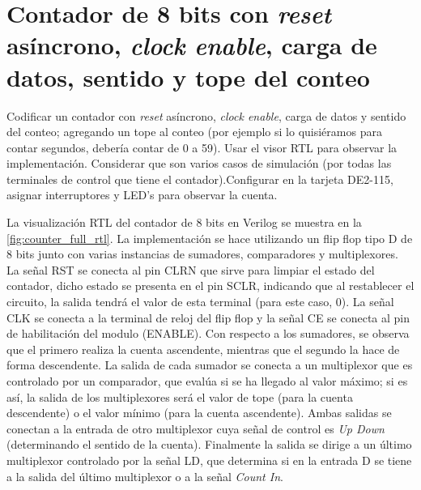 \section{Contador de 8 bits con \textit{reset} asíncrono, \textit{clock enable}, carga de datos, sentido y tope del conteo \label{sec:s4}}

\begin{center}
	\begin{minipage}{12cm}
		\begin{tcolorbox}[title=Actividad 4]
			Codificar un contador con \textit{reset} asíncrono, \textit{clock enable}, carga de datos y sentido del conteo; agregando un tope al conteo (por ejemplo si lo quisiéramos para contar segundos, debería contar de 0 a 59). Usar el visor RTL para observar la implementación. Considerar que son varios casos de simulación (por todas las terminales de control que tiene el contador).Configurar en la tarjeta DE2-115, asignar interruptores y LED's para observar la cuenta.
		\end{tcolorbox}	
	\end{minipage}
\end{center}

La visualización RTL del contador de 8 bits en Verilog se muestra en la \autoref{fig:counter_full_rtl}. La implementación se hace utilizando un flip flop tipo D de 8 bits junto con varias instancias de sumadores, comparadores y multiplexores. La señal RST se conecta al pin CLRN que sirve para limpiar el estado del contador, dicho estado se presenta en el pin SCLR, indicando que al restablecer el circuito, la salida tendrá el valor de esta terminal (para este caso, 0). La señal CLK se conecta a la terminal de reloj del flip flop y la señal CE se conecta al pin de habilitación del modulo (ENABLE). Con respecto a los sumadores, se observa que el primero realiza la cuenta ascendente, mientras que el segundo la hace de forma descendente. La salida de cada sumador se conecta a un multiplexor que es controlado por un comparador, que evalúa si se ha llegado al valor máximo; si es así, la salida de los multiplexores será el valor de tope (para la cuenta descendente) o el valor mínimo (para la cuenta ascendente). Ambas salidas se conectan a la entrada de otro multiplexor cuya señal de control es \textit{Up Down} (determinando el sentido de la cuenta). Finalmente la salida se dirige a un último multiplexor controlado por la señal LD, que determina si en la entrada D se tiene a la salida del último multiplexor o a la señal \textit{Count In}.


